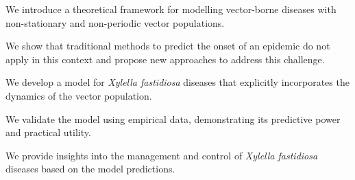 \vspace{1cm}

\begin{contributionslist}
    \item We introduce a theoretical framework for modelling vector-borne
    diseases with non-stationary and non-periodic vector populations.

    \item We show that traditional methods to predict the onset of an epidemic
    do not apply in this context and propose new approaches to address this
    challenge.

    \item We develop a model for \textit{Xylella fastidiosa} diseases that
    explicitly incorporates the dynamics of the vector population.

    \item We validate the model using empirical data, demonstrating its
    predictive power and practical utility.

    \item We provide insights into the management and control of
    \textit{Xylella fastidiosa} diseases based on the model predictions.
\end{contributionslist}
